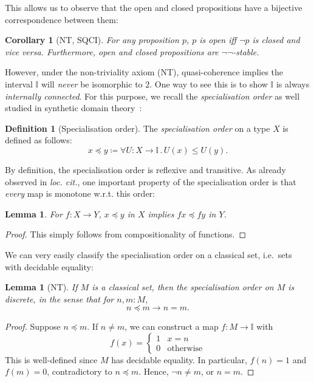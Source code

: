 \documentclass[12pt]{amsart}
\newtheorem{lemma}[theorem]{Lemma}
\newtheorem{corollary}[theorem]{Corollary}
\theoremstyle{definition}
\newtheorem{definition}[theorem]{Definition}
\newcommand{\mbb}[1]{\mathbb{#1}}
\newcommand{\I}{\mbb I}
\newcommand{\other}{\mathrm{otherwise}}
\newcommand{\dneg}{\neg\neg}
\newcommand{\fa}[2]{\forall #1\!\colon\!\!#2\mathpunct{.}}
\begin{document}
This allows us to observe that the open and closed propositions have a bijective correspondence between them:

\begin{corollary}[NT, SQCI]\label{cor:opendnegclose}
  For any proposition $p$, $p$ is open iff $\neg p$ is closed and vice versa. Furthermore, open and closed propositions are $\dneg$-stable.
\end{corollary}

However, under the non-triviality axiom (NT), quasi-coherence implies the interval $\I$ will \emph{never} be isomorphic to $2$. One way to see this is to show $\I$ is always \emph{internally connected}. For this purpose, we recall the \emph{specialisation order} as well studied in synthetic domain theory~\cite{PhoaWesleyKym-Son1991DtiR}:

\begin{definition}[Specialisation order]\label{defn:specialisation}
  The \emph{specialisation order} on a type $X$ is defined as follows:
  \[ x \preceq y \coloneq \fa{U}{X\to\I} U(x) \le U(y). \]
\end{definition}

By definition, the specialisation order is reflexive and transitive. As already observed in \emph{loc. cit.}, one important property of the specialisation order is that \emph{every} map is monotone w.r.t. this order:

\begin{lemma}\label{lem:anymapmonotoneintriscorder}
  For $f \colon X \to Y$, $x \preceq y$ in $X$ implies $fx \preceq fy$ in $Y$.
\end{lemma}
\begin{proof}
  This simply follows from compositionality of functions.
\end{proof}

We can very easily classify the specialisation order on a classical set, i.e.\ sets with decidable equality:

\begin{lemma}[NT]\label{lem:discretephoa}
  If $M$ is a classical set, then the specialisation order on $M$ is discrete, in the sense that for $n,m : M$,
  \[ n \preceq m \to n = m. \]
\end{lemma}
\begin{proof}
  Suppose $n \preceq m$. If $n \neq m$, we can construct a map $f \colon M \to \I$ with 
  \[ f(x) =
  \begin{cases}
    1 & x = n \\ 
    0 & \other
  \end{cases}
  \]
  This is well-defined since $M$ has decidable equality. In particular, $f(n) = 1$ and $f(m) = 0$, contradictory to $n \preceq m$. Hence, $\neg n \neq m$, or $n = m$.
\end{proof}
\end{document}
